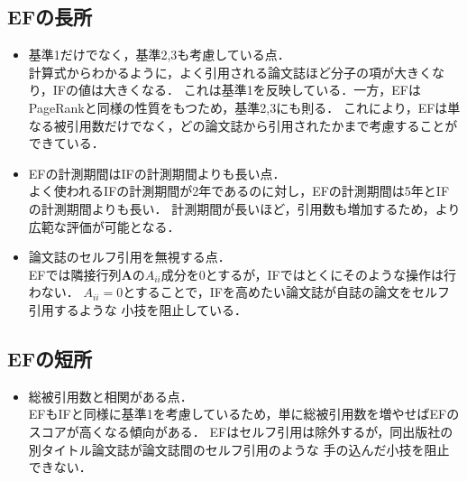 \subsection{EFの長所~\cite{Massimo2010}}
\begin{itemize}
    \item 基準1だけでなく，基準2,3も考慮している点．\\
          計算式からわかるように，よく引用される論文誌ほど分子の項が大きくなり，IFの値は大きくなる．
          これは基準1を反映している．一方，EFはPageRankと同様の性質をもつため，基準2,3にも則る．
          これにより，EFは単なる被引用数だけでなく，どの論文誌から引用されたかまで考慮することができている．
    \item EFの計測期間はIFの計測期間よりも長い点． \\
          よく使われるIFの計測期間が2年であるのに対し，EFの計測期間は5年とIFの計測期間よりも長い．
          計測期間が長いほど，引用数も増加するため，より広範な評価が可能となる．
    \item 論文誌のセルフ引用を無視する点． \\
          EFでは隣接行列$\bm{A}$の$A_{ii}$成分を0とするが，IFではとくにそのような操作は行わない．
          $A_{ii}=0$とすることで，IFを高めたい論文誌が自誌の論文をセルフ引用するような
          小技を阻止している．
\end{itemize}

\subsection{EFの短所~\cite{Masuda2013}}
\begin{itemize}
    \item 総被引用数と相関がある点．\\
          EFもIFと同様に基準1を考慮しているため，単に総被引用数を増やせばEFのスコアが高くなる傾向がある．
          EFはセルフ引用は除外するが，同出版社の別タイトル論文誌が論文誌間のセルフ引用のような
          手の込んだ小技を阻止できない．
\end{itemize}

